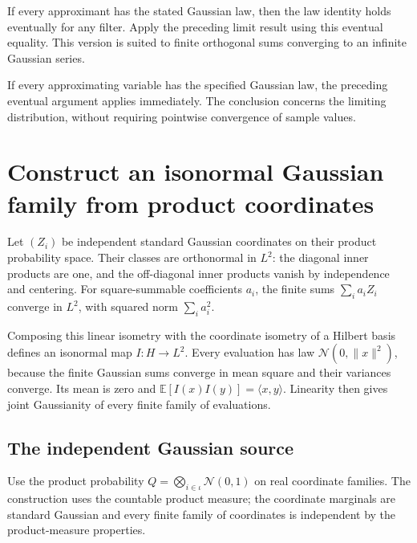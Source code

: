 \documentclass[11pt,a4paper]{report}
\begin{document}
If every approximant has the stated Gaussian law, then the law identity holds eventually for any filter. Apply the preceding limit result using this eventual equality. This version is suited to finite orthogonal sums converging to an infinite Gaussian series.



If every approximating variable has the specified Gaussian law, the preceding eventual argument applies immediately. The conclusion concerns the limiting distribution, without requiring pointwise convergence of sample values.

\section{\texorpdfstring{Construct an isonormal Gaussian family from product coordinates}{Construct an isonormal Gaussian family from product coordinates}}
\label{proof-module-UnadjustedLangevin-GaussianHilbert-lean}


Let \((Z_i)\) be independent standard Gaussian coordinates on their product probability space. Their classes are orthonormal in \(L^2\): the diagonal inner products are one, and the off-diagonal inner products vanish by independence and centering. For square-summable coefficients \(a_i\), the finite sums \(\sum_i a_iZ_i\) converge in \(L^2\), with squared norm \(\sum_i a_i^2\).



Composing this linear isometry with the coordinate isometry of a Hilbert basis defines an isonormal map \(I:H\to L^2\). Every evaluation has law \(\mathcal N(0,\|x\|^2)\), because the finite Gaussian sums converge in mean square and their variances converge. Its mean is zero and \(\mathbb E[I(x)I(y)]=\langle x,y\rangle\). Linearity then gives joint Gaussianity of every finite family of evaluations.

\subsection{\texorpdfstring{The independent Gaussian source}{The independent Gaussian source}}
\label{report-step-UnadjustedLangevin-GaussianHilbert-lean-1}


Use the product probability \(Q=\bigotimes_{i\in\iota}\mathcal N(0,1)\) on real coordinate families. The construction uses the countable product measure; the coordinate marginals are standard Gaussian and every finite family of coordinates is independent by the product-measure properties.
\end{document}
